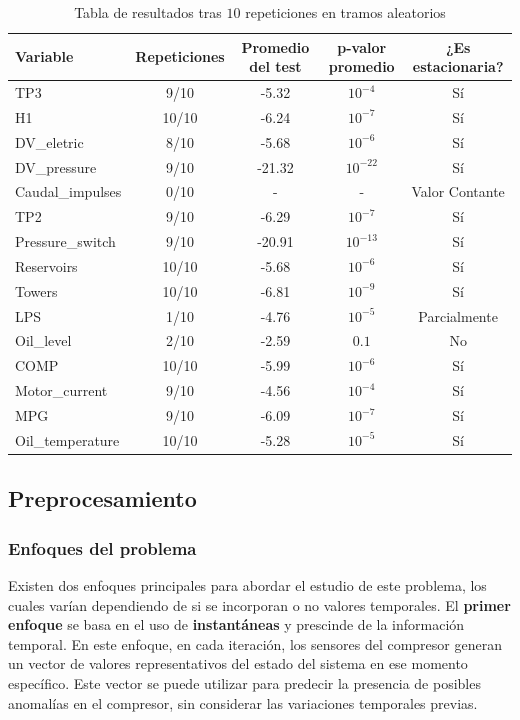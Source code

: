 \documentclass[12pt,letterpaper]{article}
\begin{document}
\begin{table}[htp]
    \centering
    \begin{tabular}{lcccc}
    \hline
    Variable & Repeticiones & Promedio del test & p-valor promedio & ¿Es estacionaria? \\
    \hline
    TP3 & 9/10 & -5.32 & $10^{-4}$ & Sí \\
    H1 & 10/10 & -6.24 & $10^{-7}$ & Sí \\
    DV\_eletric & 8/10 & -5.68 & $10^{-6}$ & Sí \\
    DV\_pressure & 9/10 & -21.32 & $10^{-22}$ & Sí \\
    Caudal\_impulses & 0/10 & - & - & Valor Contante \\
    TP2 & 9/10 & -6.29 & $10^{-7}$ & Sí \\
    Pressure\_switch & 9/10 & -20.91 & $10^{-13}$ & Sí \\
    Reservoirs & 10/10 & -5.68 & $10^{-6}$ & Sí \\
    Towers & 10/10 & -6.81 & $10^{-9}$ & Sí \\
    LPS & 1/10 & -4.76 & $10^{-5}$ & Parcialmente \\
    Oil\_level & 2/10 & -2.59 & $0.1$ & No \\
    COMP & 10/10 & -5.99 & $10^{-6}$ & Sí \\
    Motor\_current & 9/10 & -4.56 & $10^{-4}$ & Sí \\
    MPG & 9/10 & -6.09 & $10^{-7}$ & Sí \\
    Oil\_temperature & 10/10 & -5.28 & $10^{-5}$ & Sí \\
    \hline
    \end{tabular}
    \caption{Tabla de resultados tras $10$ repeticiones en tramos aleatorios}
    \label{tab:stationary_results}
\end{table}


\subsection{Preprocesamiento}

\subsubsection{Enfoques del problema}


Existen dos enfoques principales para abordar el estudio de este problema, los cuales varían dependiendo de si se incorporan o no valores temporales. El \textbf{primer enfoque} se basa en el uso de \textbf{instantáneas} y prescinde de la información temporal. En este enfoque, en cada iteración, los sensores del compresor generan un vector de valores representativos del estado del sistema en ese momento específico. Este vector se puede utilizar para predecir la presencia de posibles anomalías en el compresor, sin considerar las variaciones temporales previas.
\end{document}
